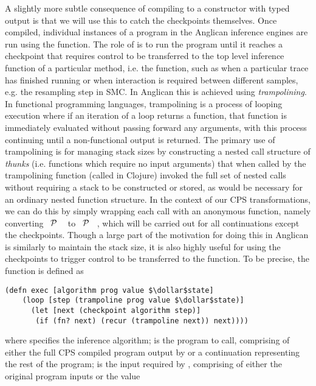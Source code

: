 A slightly more subtle consequence of compiling to a constructor with typed output is that
we will use this to catch the checkpoints themselves.  Once compiled, individual instances of
a program in the Anglican inference engines are run using the  function.  The role of
 is to run the program until it reaches a checkpoint that requires control to be transferred
to the top level inference function of a particular method, i.e. the \anginfer function, such as when
a particular trace has finished running or when interaction is required between different samples, e.g. 
the resampling step in SMC.  In Anglican this is achieved using \emph{trampolining}.  In functional
programming languages, trampolining is a process of looping execution where if an iteration of
a loop returns a function, that function is immediately evaluated without passing forward any arguments,
with this process continuing until a non-functional output is returned.  The primary use of trampolining
is for managing stack sizes by constructing a nested call structure of \emph{thunks} (i.e. functions which
require no input arguments) that when called by the trampolining function (called  in Clojure)
invoked the full set of nested calls without requiring a stack to be constructed or stored, as would be necessary
for an ordinary nested function structure.  In the context of our CPS transformations, we can do this by simply
wrapping each call with an anonymous function, namely converting ~$\mathcal{P}$ ~\angstate\clj{)}
to ~$\mathcal{P}$ ~\angstate\clj{))}, which will be carried out for all continuations
except the checkpoints.  Though a large part of the motivation for doing this in
Anglican is similarly to maintain the stack size, it is also highly useful for using the checkpoints to trigger
control to be transferred to the \anginfer function.  To be precise, the  function is defined as
\begin{lstlisting}[basicstyle=\ttfamily\small,frame=none]
  (defn exec [algorithm prog value $\dollar$state]
    (loop [step (trampoline prog value $\dollar$state)]
      (let [next (checkpoint algorithm step)]
       (if (fn? next) (recur (trampoline next)) next))))
\end{lstlisting}\vspace{-8pt}
where  specifies the inference algorithm;  is the program to call, comprising of either the full
CPS compiled program output by \query or a continuation representing the rest of the program; 
 is the input required by , comprising of either the original program inputs or the value
